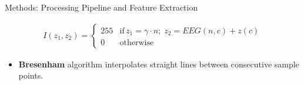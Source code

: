 \documentclass[final,hyperref={pdfpagelabels=false}]{beamer}
\begin{document}
\begin{frame}[t]
\begin{columns}[t]
\begin{column}{.465\textwidth}
\begin{block}{Methods: Processing Pipeline and Feature Extraction}
\begin{enumerate}
\begin{align*}
I(z_1,z_2) = \left\{ \begin{array}{rl}
255 & \text{if} \,  z_1 = \gamma \cdot n; \; z_2 = EEG(n,c) + z(c) \\
0   & \mbox{otherwise}
\end{array}\right.
\label{eq:plotting}
\end{align*}

\begin{itemize}
\item \textbf{Bresenham} algorithm interpolates straight lines between consecutive sample points.
\end{itemize}

\begin{figure}[htb]
\centering
{}

\end{figure}
\end{enumerate}
\end{block}
\end{column}
\end{columns}
\end{frame}
\end{document}
